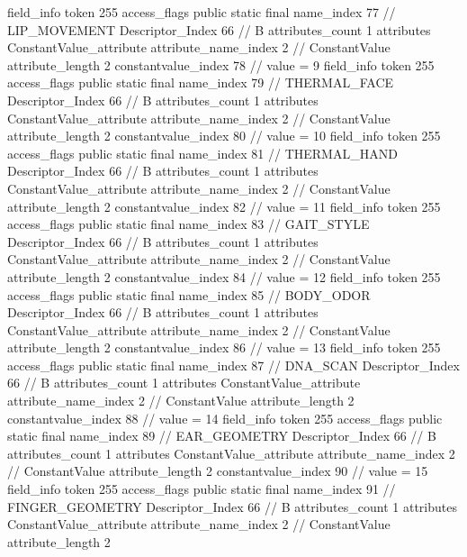 {{{{{{{				}
				}
			}
			field_info {
				token	255
				access_flags	public static final
				name_index	77		// LIP_MOVEMENT
				Descriptor_Index	66		// B
				attributes_count	1
				attributes {
				ConstantValue_attribute {
					attribute_name_index	2		// ConstantValue
					attribute_length	2
					constantvalue_index	78		// value = 9
				}
				}
			}
			field_info {
				token	255
				access_flags	public static final
				name_index	79		// THERMAL_FACE
				Descriptor_Index	66		// B
				attributes_count	1
				attributes {
				ConstantValue_attribute {
					attribute_name_index	2		// ConstantValue
					attribute_length	2
					constantvalue_index	80		// value = 10
				}
				}
			}
			field_info {
				token	255
				access_flags	public static final
				name_index	81		// THERMAL_HAND
				Descriptor_Index	66		// B
				attributes_count	1
				attributes {
				ConstantValue_attribute {
					attribute_name_index	2		// ConstantValue
					attribute_length	2
					constantvalue_index	82		// value = 11
				}
				}
			}
			field_info {
				token	255
				access_flags	public static final
				name_index	83		// GAIT_STYLE
				Descriptor_Index	66		// B
				attributes_count	1
				attributes {
				ConstantValue_attribute {
					attribute_name_index	2		// ConstantValue
					attribute_length	2
					constantvalue_index	84		// value = 12
				}
				}
			}
			field_info {
				token	255
				access_flags	public static final
				name_index	85		// BODY_ODOR
				Descriptor_Index	66		// B
				attributes_count	1
				attributes {
				ConstantValue_attribute {
					attribute_name_index	2		// ConstantValue
					attribute_length	2
					constantvalue_index	86		// value = 13
				}
				}
			}
			field_info {
				token	255
				access_flags	public static final
				name_index	87		// DNA_SCAN
				Descriptor_Index	66		// B
				attributes_count	1
				attributes {
				ConstantValue_attribute {
					attribute_name_index	2		// ConstantValue
					attribute_length	2
					constantvalue_index	88		// value = 14
				}
				}
			}
			field_info {
				token	255
				access_flags	public static final
				name_index	89		// EAR_GEOMETRY
				Descriptor_Index	66		// B
				attributes_count	1
				attributes {
				ConstantValue_attribute {
					attribute_name_index	2		// ConstantValue
					attribute_length	2
					constantvalue_index	90		// value = 15
				}
				}
			}
			field_info {
				token	255
				access_flags	public static final
				name_index	91		// FINGER_GEOMETRY
				Descriptor_Index	66		// B
				attributes_count	1
				attributes {
				ConstantValue_attribute {
					attribute_name_index	2		// ConstantValue
					attribute_length	2
}}}}}}}
